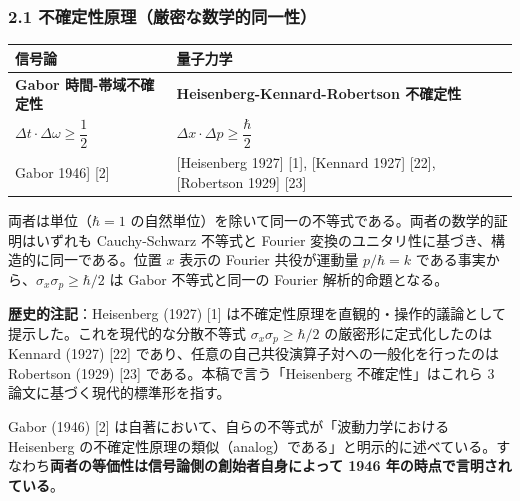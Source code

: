 \documentclass[
]{ltjsarticle}
\newcounter{none} %
\begin{document}
\subsubsection{2.1
不確定性原理（厳密な数学的同一性）}\label{ux4e0dux78baux5b9aux6027ux539fux7406ux53b3ux5bc6ux306aux6570ux5b66ux7684ux540cux4e00ux6027}

{\def\LTcaptype{none} %
\begin{longtable}[]{@{}
  >{\raggedright\arraybackslash}p{}
  >{\raggedright\arraybackslash}p{}@{}}
\toprule\noalign{}
\begin{minipage}[b]{\linewidth}\raggedright
信号論
\end{minipage} & \begin{minipage}[b]{\linewidth}\raggedright
量子力学
\end{minipage} \\
\midrule\noalign{}
\endhead
\bottomrule\noalign{}
\endlastfoot
\textbf{Gabor 時間-帯域不確定性} & \textbf{Heisenberg-Kennard-Robertson
不確定性} \\
\(\Delta t \cdot \Delta \omega \geq \dfrac{1}{2}\) &
\(\Delta x \cdot \Delta p \geq \dfrac{\hbar}{2}\) \\
{[}Gabor 1946{]} {[}2{]} & {[}Heisenberg 1927{]} {[}1{]}, {[}Kennard
1927{]} {[}22{]}, {[}Robertson 1929{]} {[}23{]} \\
\end{longtable}
}

両者は単位（\(\hbar = 1\)
の自然単位）を除いて同一の不等式である。両者の数学的証明はいずれも
Cauchy-Schwarz 不等式と Fourier
変換のユニタリ性に基づき、構造的に同一である。位置 \(x\) 表示の Fourier
共役が運動量 \(p/\hbar = k\)
である事実から、\(\sigma_x \sigma_p \geq \hbar/2\) は Gabor
不等式と同一の Fourier 解析的命題となる。

\textbf{歴史的注記}：Heisenberg (1927) {[}1{]}
は不確定性原理を直観的・操作的議論として提示した。これを現代的な分散不等式
\(\sigma_x \sigma_p \geq \hbar/2\) の厳密形に定式化したのは Kennard
(1927) {[}22{]} であり、任意の自己共役演算子対への一般化を行ったのは
Robertson (1929) {[}23{]} である。本稿で言う「Heisenberg
不確定性」はこれら 3 論文に基づく現代的標準形を指す。

Gabor (1946) {[}2{]} は自著において、自らの不等式が「波動力学における
Heisenberg
の不確定性原理の類似（analog）である」と明示的に述べている。すなわち\textbf{両者の等価性は信号論側の創始者自身によって
1946 年の時点で言明されている}。
\end{document}
